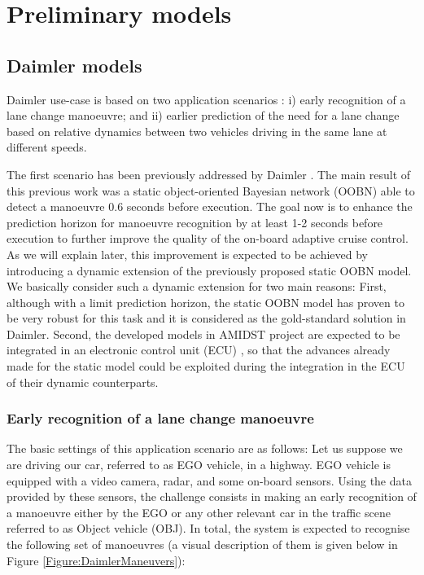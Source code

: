 \section{Preliminary models}
\label{Section:PreliminaryModels}
\subsection{Daimler models}
\label{Section:DaimlerModels}



Daimler use-case is based on two application scenarios \cite{Fer14}: i) early recognition of a lane change manoeuvre; and ii) earlier prediction of the need for a lane change based on relative dynamics between two vehicles driving in the same lane at different speeds. 

The first scenario has been previously addressed by Daimler \cite{kasper2012object}. The main result of this previous work was a static object-oriented Bayesian network (OOBN) \cite{KollerPfeffer1997} able to detect a manoeuvre 0.6 seconds before execution. The goal now is to enhance the prediction horizon for manoeuvre recognition by at least 1-2 seconds before execution to further improve the quality of the on-board adaptive cruise control. As we will explain later, this improvement is expected to be achieved by introducing a dynamic extension of the previously proposed static OOBN model. We basically consider such a dynamic extension for two main reasons: First, although with a limit prediction horizon, the static OOBN model has proven to be very robust for this task and it is considered as the gold-standard solution in Daimler. Second, the developed models in AMIDST project are expected to be integrated in an electronic control unit (ECU) \cite{Fer14}, so that the advances already made for the static model \cite{Weidl2014} could be exploited during the integration in the ECU of their dynamic counterparts. 

\subsubsection{Early recognition of a lane change manoeuvre}
\label{Section:Daimler:EarlyRecognition}

The basic settings of this application scenario are as follows: Let us suppose we are driving our car, referred to as EGO vehicle, in a highway. EGO vehicle is equipped with a video camera, radar, and some on-board sensors. Using the data provided by these sensors, the challenge consists in making an early recognition of a manoeuvre either by the EGO or any other relevant car in the traffic scene referred to as Object vehicle (OBJ). In total, the system is expected to recognise the following set of manoeuvres (a visual description of them is given below in Figure \ref{Figure:DaimlerManeuvers}):

